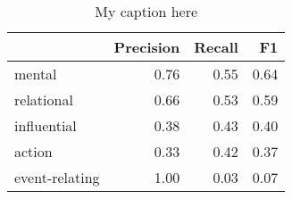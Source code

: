 \begin{table}[!ht]
\centering
\begin{tabular}{lrrr}
\toprule
{} &  Precision &  Recall &   F1 \\
\midrule
mental         &       0.76 &    0.55 & 0.64 \\
relational     &       0.66 &    0.53 & 0.59 \\
influential    &       0.38 &    0.43 & 0.40 \\
action         &       0.33 &    0.42 & 0.37 \\
event-relating &       1.00 &    0.03 & 0.07 \\
\bottomrule
\end{tabular}
\caption{My caption here}
\label{tab:PROCESS_TYPE-oe-combined-F1}
\end{table}